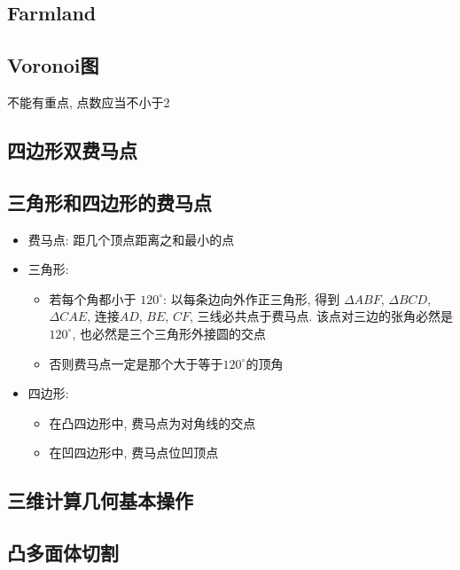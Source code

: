 \documentclass[landscape, twocolumn, 8pt, a4paper, twoside]{extarticle}
\begin{document}
\begin{spacing}{0.1}
  \subsection{Farmland}
  

  \subsection{Voronoi图}
  不能有重点, 点数应当不小于2
  

  \subsection{四边形双费马点}
  

  \subsection{三角形和四边形的费马点}
  \begin{itemize}
  \item 费马点: 距几个顶点距离之和最小的点
  \item 三角形:
      \begin{itemize}
      \item 若每个角都小于 $120^{\circ}$: 以每条边向外作正三角形, 得到 $\Delta ABF$, $\Delta BCD$, $\Delta CAE$, 连接$AD$, $BE$, $CF$, 三线必共点于费马点. 该点对三边的张角必然是$120^{\circ}$, 也必然是三个三角形外接圆的交点
      \item 否则费马点一定是那个大于等于$120^{\circ}$的顶角
      \end{itemize}
  \item 四边形:
      \begin{itemize}
        \item 在凸四边形中, 费马点为对角线的交点
        \item 在凹四边形中, 费马点位凹顶点
      \end{itemize}
  \end{itemize}

  \subsection{三维计算几何基本操作}
  

  \subsection{凸多面体切割}
  


\end{spacing}
\end{document}
